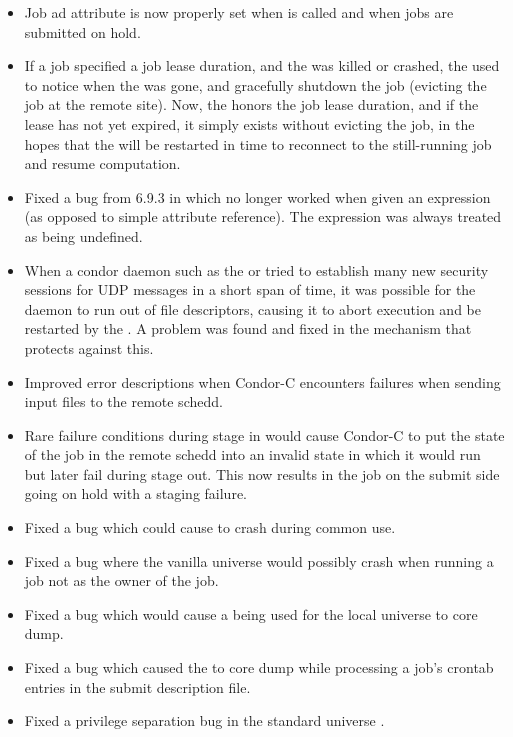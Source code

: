 \begin{itemize}
\item Job ad attribute  is now properly set when
 is called and when jobs are submitted on hold.

\item If a job specified a job lease duration, and the 
  was killed or crashed, the  used to notice when the
   was gone, and gracefully shutdown the job (evicting
  the job at the remote site).
  Now, the  honors the job lease duration, and if the
  lease has not yet expired, it simply exists without evicting the
  job, in the hopes that the  will be restarted in time
  to reconnect to the still-running job and resume computation.

\item Fixed a bug from 6.9.3 in which   no longer
worked when given an expression (as opposed to simple attribute reference).
The expression was always treated as being undefined.

\item When a condor daemon such as the  or
 tried to establish many new security sessions for
UDP messages in a short span of time, it was possible for the daemon
to run out of file descriptors, causing it to abort execution and be
restarted by the .  A problem was found and fixed in the
mechanism that protects against this.

\item Improved error descriptions when Condor-C encounters failures when
sending input files to the remote schedd.

\item Rare failure conditions during stage in would cause Condor-C to put
the state of the job in the remote schedd into an invalid state in which
it would run but later fail during stage out.  This now results in the
job on the submit side going on hold with a staging failure.

\item Fixed a bug which could cause  to crash during
common use.

\item Fixed a bug where the vanilla universe  would possibly
crash when running a job not as the owner of the job.

\item Fixed a bug which would cause a  being used for
the local universe to core dump.

\item Fixed a bug which caused the  to core dump while
processing a job's crontab entries in the submit description file.

\item Fixed a privilege separation bug in the standard universe 
.

\end{itemize}

